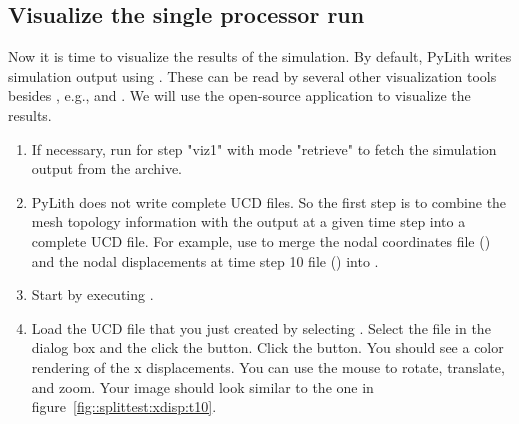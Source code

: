\subsection{Visualize the single processor run}

Now it is time to visualize the results of the simulation. By default,
PyLith writes simulation output using .
These can be read by several other visualization tools besides
, e.g.,  and . We will use the open-source application
 to visualize the results.
    
\begin{enumerate}
\item If necessary, run  for step "viz1" with mode
  "retrieve" to fetch the simulation output from the archive.

  \begin{screen}
    \shellprompt{}
  \end{screen}
  
\item PyLith does not write complete UCD files. So the first step is
  to combine the mesh topology information with the output at a given
  time step into a complete UCD file. For example, use 
  to merge the nodal coordinates file
  () and the nodal displacements at
  time step 10 file () into
  .

  \begin{screen}
    \shellprompt{}
\end{screen}

\item Start  by executing .

  \begin{screen}
    \shellprompt{}
  \end{screen}
  
\item Load the UCD file that you just created by selecting
  \guiselect{}. Select the file in
  the dialog box and the click the  button. Click the
   button. You should see a color rendering of the x
  displacements. You can use the mouse to rotate, translate, and zoom.
  Your image should look similar to the one in
  figure~\ref{fig::splittest:xdisp:t10}.
        

\end{enumerate}
